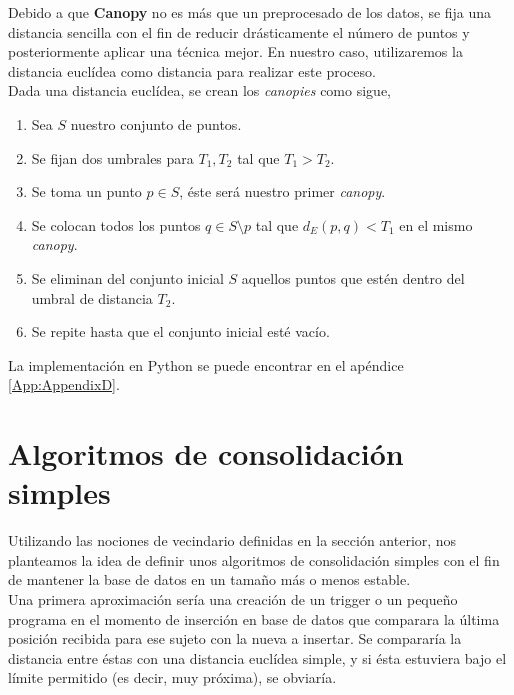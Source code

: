 \documentclass[a4paper, 12pt]{article}
\begin{document}
Debido a que \textbf{Canopy} no es m\'as que un preprocesado de los datos, se fija una distancia sencilla con el fin de reducir dr\'asticamente el n\'umero de puntos y posteriormente aplicar una t\'ecnica mejor. En nuestro caso, utilizaremos la distancia eucl\'idea como distancia para realizar este proceso. \\

Dada una distancia eucl\'idea, se crean los \textit{canopies} como sigue,\\

\begin{enumerate}
	\item Sea $S$ nuestro conjunto de puntos.
	\item Se fijan dos umbrales para $T_1, T_2$ tal que $T_1 > T_2$. 
	\item Se toma un punto $p\in S$, \'este ser\'a nuestro primer \textit{canopy}.
	\item Se colocan todos los puntos $q\in S\setminus{p}$ tal que $d_E(p, q) < T_1$ en el mismo \textit{canopy}. 
	\item Se eliminan del conjunto inicial $S$ aquellos puntos que est\'en dentro del umbral de distancia $T_2$.
	\item Se repite hasta que el conjunto inicial est\'e vac\'io.
\end{enumerate}

La implementaci\'on en Python se puede encontrar en el ap\'endice \ref{App:AppendixD}.\\

\pagebreak
\section{Algoritmos de consolidaci\'on simples}

Utilizando las nociones de vecindario definidas en la secci\'on anterior, nos planteamos la idea de definir unos algoritmos de consolidaci\'on simples con el fin de mantener la base de datos en un tama\~no m\'as o menos estable. \\

Una primera aproximaci\'on ser\'ia una creaci\'on de un trigger o un peque\~no programa en el momento de inserci\'on en base de datos que comparara la \'ultima posici\'on recibida para ese sujeto con la nueva a insertar. Se comparar\'ia la distancia entre \'estas con una distancia eucl\'idea simple, y si \'esta estuviera bajo el l\'imite permitido (es decir, muy pr\'oxima), se obviar\'ia. \\
\end{document}
